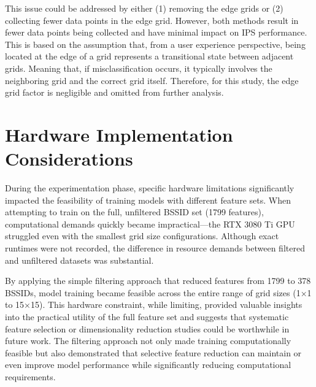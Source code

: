 \documentclass[runningheads]{llncs}
\begin{document}
This issue could be addressed by either (1) removing the edge grids or (2) collecting fewer data points in the edge grid. However, both methods result in fewer data points being collected and have minimal impact on IPS performance. This is based on the assumption that, from a user experience perspective, being located at the edge of a grid represents a transitional state between adjacent grids. Meaning that, if misclassification occurs, it typically involves the neighboring grid and the correct grid itself. Therefore, for this study, the edge grid factor is negligible and omitted from further analysis.

\section{Hardware Implementation Considerations}
During the experimentation phase, specific hardware limitations significantly impacted the feasibility of training models with different feature sets. When attempting to train on the full, unfiltered BSSID set (1799 features), computational demands quickly became impractical—the RTX 3080 Ti GPU struggled even with the smallest grid size configurations. Although exact runtimes were not recorded, the difference in resource demands between filtered and unfiltered datasets was substantial.

By applying the simple filtering approach that reduced features from 1799 to 378 BSSIDs, model training became feasible across the entire range of grid sizes (1×1 to 15×15). This hardware constraint, while limiting, provided valuable insights into the practical utility of the full feature set and suggests that systematic feature selection or dimensionality reduction studies could be worthwhile in future work. The filtering approach not only made training computationally feasible but also demonstrated that selective feature reduction can maintain or even improve model performance while significantly reducing computational requirements.
\end{document}
